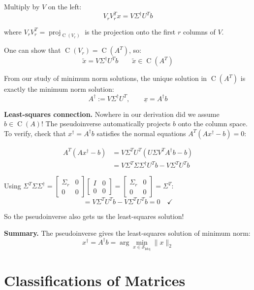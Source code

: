 \documentclass[11pt]{article}
\theoremstyle{definition}
\theoremstyle{plain}
\theoremstyle{remark}
\DeclareMathOperator{\proj}{proj}
\DeclareMathOperator{\Col}{C}
\begin{document}
Multiply by $V$ on the left:
\[
V_r V_r^T x = V\Sigma^\dagger U^T b
\]

where $V_r V_r^T = \proj_{\Col(V_r)}$ is the projection onto the first $r$ columns of $V$.

One can show that $\Col(V_r) = \Col(A^T)$, so:
\[
\tilde{x} = V\Sigma^\dagger U^T b \qquad \tilde{x} \in \Col(A^T)
\]

From our study of minimum norm solutions, the unique solution in $\Col(A^T)$ is exactly the minimum norm solution:
\[
\boxed{A^\dagger := V\Sigma^\dagger U^T, \qquad \underline{x} = A^\dagger b}
\]

\medskip
\textbf{Least-squares connection.} Nowhere in our derivation did we assume $b \in \Col(A)$! The pseudoinverse automatically projects $b$ onto the column space. To verify, check that $x^\dagger = A^\dagger b$ satisfies the normal equations $A^T(Ax^\dagger - b) = 0$:

\begin{align*}
A^T(Ax^\dagger - b) &= V\Sigma^T U^T(U\Sigma V^T A^\dagger b - b) \\
&= V\Sigma^T \Sigma \Sigma^\dagger U^T b - V\Sigma^T U^T b
\end{align*}

Using $\Sigma^T \Sigma \Sigma^\dagger = \begin{bmatrix} \Sigma_r & 0 \\ 0 & 0 \end{bmatrix} \begin{bmatrix} I & 0 \\ 0 & 0 \end{bmatrix} = \begin{bmatrix} \Sigma_r & 0 \\ 0 & 0 \end{bmatrix} = \Sigma^T$:
\[
= V\Sigma^T U^T b - V\Sigma^T U^T b = 0 \quad \checkmark
\]

So the pseudoinverse also gets us the least-squares solution!

\medskip
\textbf{Summary.} The pseudoinverse gives the least-squares solution of minimum norm:
\[
\boxed{x^\dagger = A^\dagger b = \arg\min_{x \in \mathcal{S}_{\text{lstq}}} \|x\|_2}
\]

\newpage
\section{Classifications of Matrices}
\end{document}
